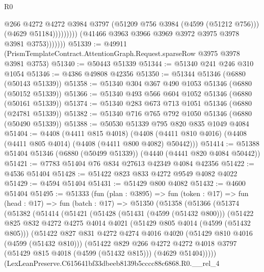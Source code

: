\begin{lexlean}{R0}
\begin{coremodule}
                                @266
                                @4272
                                @4272
                                @3984
                                @3797
                                (@51209 @756 @3984 (@4599 (@51212 @756)))
                                (@4629 @51184)))))))))
                (@41466 @3963 @3966 @3969 @3972 @3975 @3978 @3981 @3753)))))))
@51339 := @49911 (PrismTemplateContract.AttentionGraph.Request.sparseRow @3975 @3978 @3981 @3753)
@51340 := @50443 @51339
@51344 := @51340 @241 @246 @310 @1054
@51346 := @4386 @49808 @42356
@51350 := @51344 @51346 (@6880 (@50143 @51339))
@51358 := @51340 @304 @367 @490 @1053 @51346 (@6880 (@50152 @51339))
@51366 := @51340 @493 @566 @604 @1052 @51346 (@6880 (@50161 @51339))
@51374 := @51340 @283 @673 @713 @1051 @51346 (@6880 (@24781 @51339))
@51382 := @51340 @716 @765 @792 @1050 @51346 (@6880 (@50490 @51339))
@51388 := @50530 @51339 @795 @820 @835 @1049 @4084
@51404 := @4408
    (@4411 @815 @4018)
    (@4408 (@4411 @810 @4016) (@4408 (@4411 @805 @4014) (@4408 (@4411 @800 @4082) @50442)))
@51414 := @51388 @51404 @51346 (@6880 (@50499 @51339)) (@4440 (@4441 @820 @4084 @50442))
@51421 := @7783 @51404 @76 @834 @27613 @42349 @4084 @42356
@51422 := @4536 @51404
@51428 := @51422 @823 @833 @4272 @9549 @4082 @4022
@51429 := @4594 @51404
@51431 := @51429 @800 @4082
@51432 := @4600 @51404
@51495 := @51333
    (fun (plan : @3895) =>
    fun (token : @17) =>
    fun (head : @17) =>
    fun (batch : @17) =>
    @51350
      (@51358
        (@51366
          (@51374
            (@51382
              (@51414
                (@51421
                  (@51428
                    (@51431 (@4599 (@51432 @800)))
                    (@51422
                      @825
                      @832
                      @4272
                      @4275
                      @4014
                      @4021
                      (@51429 @805 @4014 (@4599 (@51432 @805)))
                      (@51422
                        @827
                        @831
                        @4272
                        @4274
                        @4016
                        @4020
                        (@51429 @810 @4016 (@4599 (@51432 @810)))
                        (@51422
                          @829
                          @266
                          @4272
                          @4272
                          @4018
                          @3797
                          (@51429 @815 @4018 (@4599 (@51432 @815)))
                          (@4629 @51404)))))
                  (LexLeanPreserve.C615641bf33dbeeb8139b5cccc88c6868.R0.__rel_4

\end{coremodule}
\end{lexlean}
